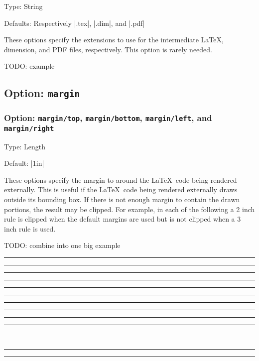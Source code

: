 \documentclass[10pt]{ltxdoc}
\newcommand{\opt}[1]{\texttt{#1}}
\def\sz{%
  \rule{0.2em}{7pt}%
  \llap{\rule[8pt]{0.2em}{2pt}}%
}
\begin{document}
Type: String

Defaults: Respectively |.tex|, |.dim|, and |.pdf|

These options specify the extensions to use for the intermediate
\LaTeX, dimension, and PDF files, respectively.
This option is rarely needed.

TODO: example

\subsection{Option: \opt{margin}}
\label{subsec:margin}

\subsubsection{Option: \opt{margin/top}, \opt{margin/bottom}, \opt{margin/left}, and \opt{margin/right}}
\label{subsubsec:margin/top, margin/bottom, margin/left, and margin/right}

Type: Length

Default: |1in|

These options specify the margin to around the \LaTeX\ code being
rendered externally.
This is useful if the \LaTeX\ code being rendered externally draws
outside its bounding box.
If there is not enough margin to contain the drawn portions, the result
may be clipped.
For example, in each of the following a 2 inch rule is clipped when the
default margins are used but is not clipped when a 3 inch rule is used.

TODO: combine into one big example

\begin{tcblisting}{}
\sz{}\sz

\sz{}\sz
\end{tcblisting}

\begin{tcblisting}{}
\begin{flushright}
\sz{}\sz

\sz{}\sz
\end{flushright}
\end{tcblisting}

\begin{tcblisting}{}
\vspace{2in}
\sz{}\sz~
\sz{}\sz
\end{tcblisting}
\end{document}
